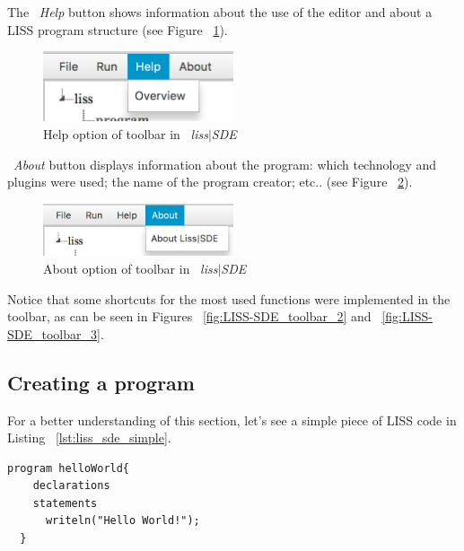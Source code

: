 \documentclass[
  oneside,
  11pt, a4paper,
  footinclude=true,
  headinclude=true,
  cleardoublepage=empty
]{scrbook}
\begin{document}
The ~\textit{Help} button shows information about the use of the editor and about a LISS program structure (see Figure ~\ref{fig:LISS-SDE_toolbar_4}).

\begin{figure}[h!]
  \centering
    \includegraphics[width=0.5\textwidth]{img/LISS-SDE_toolbar_menu/ToolBar_menu4.png}
    \caption{Help option of toolbar in ~\textit{liss$|$SDE}}
    \label{fig:LISS-SDE_toolbar_4}
\end{figure}

~\textit{About} button displays information about the program: which technology and plugins were used; the name of the program creator; etc.. (see Figure ~\ref{fig:LISS-SDE_toolbar_5}).

\begin{figure}[h!]
  \centering
    \includegraphics[width=0.5\textwidth]{img/LISS-SDE_toolbar_menu/ToolBar_menu5.png}
    \caption{About option of toolbar in ~\textit{liss$|$SDE}}
    \label{fig:LISS-SDE_toolbar_5}
\end{figure}

Notice that some shortcuts for the most used functions were implemented in the toolbar, as can be seen in Figures ~\ref{fig:LISS-SDE_toolbar_2} and ~\ref{fig:LISS-SDE_toolbar_3}.

\newpage

\subsection{Creating a program}
\label{sec:creating_program_liss_sde}

For a better understanding of this section, let's see a simple piece of LISS code in Listing ~\ref{lst:liss_sde_simple}.

\begin{lstlisting}[caption={LISS code},label={lst:liss_sde_simple}]
  program helloWorld{
    declarations
    statements
      writeln("Hello World!");
  }
\end{lstlisting}
\end{document}

